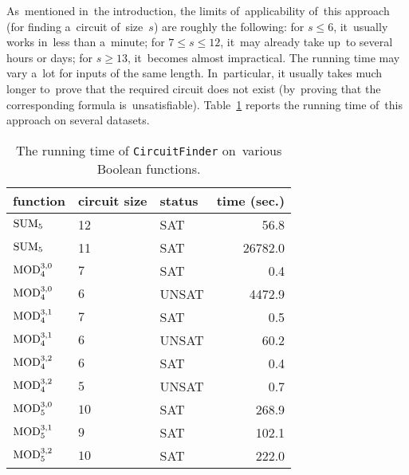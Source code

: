 As~mentioned in~the introduction, the limits
of~applicability of~this approach (for finding a~circuit
of~size~$s$) are roughly the following:
for $s \le 6$, it~usually works in~less than a~minute;
for $7 \le s \le 12$, it~may already take up~to
several hours or days; for $s \ge 13$, it~becomes almost impractical. The running time may vary a~lot
for inputs of the same length. In~particular,
it usually takes much longer to~prove that
the required circuit does not exist (by~proving that the corresponding formula is~unsatisfiable). Table~\ref{table:runningtimes} reports the running time
of~this approach on several datasets.

\begin{table}[!ht]
\begin{center}
\begin{tabular}{lllr}
\toprule
function & circuit size & status & time (sec.)\\
\midrule
$\operatorname{SUM}_5$ & 12 & SAT & 56.8\\
$\operatorname{SUM}_5$ & 11 & SAT & 26782.0\\
$\operatorname{MOD}_4^{3,0}$ & $7$ & SAT & 0.4\\
$\operatorname{MOD}_4^{3,0}$ & $6$ & UNSAT & 4472.9\\
$\operatorname{MOD}_4^{3,1}$ & $7$ & SAT & 0.5\\
$\operatorname{MOD}_4^{3,1}$ & $6$ & UNSAT & 60.2\\
$\operatorname{MOD}_4^{3,2}$ & $6$ & SAT & 0.4\\
$\operatorname{MOD}_4^{3,2}$ & $5$ & UNSAT & 0.7\\
$\operatorname{MOD}_5^{3,0}$ & $10$ & SAT & 268.9\\
$\operatorname{MOD}_5^{3,1}$ & $9$ & SAT & 102.1\\
$\operatorname{MOD}_5^{3,2}$ & $10$ & SAT & 222.0\\
\bottomrule
\end{tabular}
\end{center}
\caption{The running time of \texttt{CircuitFinder} on~various Boolean functions.} \label{table:runningtimes}
\end{table}



